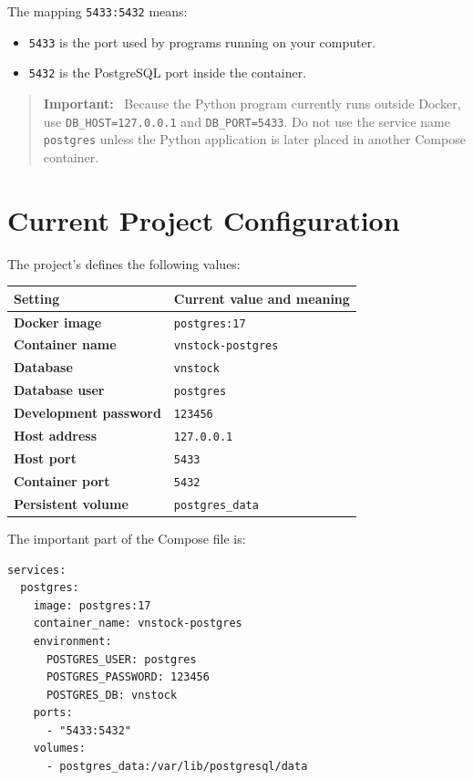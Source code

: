 \documentclass[11pt,a4paper]{article}
\newcommand{\filename}[1]{\texttt{\detokenize{#1}}}
\newenvironment{important}
  {\begin{quote}\color{codered}\textbf{Important:}\ }
  {\end{quote}}
\begin{document}
The mapping \texttt{5433:5432} means:

\begin{itemize}[leftmargin=2em]
    \item \texttt{5433} is the port used by programs running on your computer.
    \item \texttt{5432} is the PostgreSQL port inside the container.
\end{itemize}

\begin{important}
Because the Python program currently runs outside Docker, use
\texttt{DB\_HOST=127.0.0.1} and \texttt{DB\_PORT=5433}. Do not use the service
name \texttt{postgres} unless the Python application is later placed in another
Compose container.
\end{important}

\section{Current Project Configuration}

The project's \filename{docker-compose.yml} defines the following values:

\begin{center}
\begin{tabular}{>{\bfseries}p{4.3cm} p{7.7cm}}
\toprule
Setting & Current value and meaning \\
\midrule
Docker image & \texttt{postgres:17} \\
Container name & \texttt{vnstock-postgres} \\
Database & \texttt{vnstock} \\
Database user & \texttt{postgres} \\
Development password & \texttt{123456} \\
Host address & \texttt{127.0.0.1} \\
Host port & \texttt{5433} \\
Container port & \texttt{5432} \\
Persistent volume & \texttt{postgres\_data} \\
\bottomrule
\end{tabular}
\end{center}

The important part of the Compose file is:

\begin{lstlisting}[style=terminal]
services:
  postgres:
    image: postgres:17
    container_name: vnstock-postgres
    environment:
      POSTGRES_USER: postgres
      POSTGRES_PASSWORD: 123456
      POSTGRES_DB: vnstock
    ports:
      - "5433:5432"
    volumes:
      - postgres_data:/var/lib/postgresql/data
\end{lstlisting}
\end{document}
